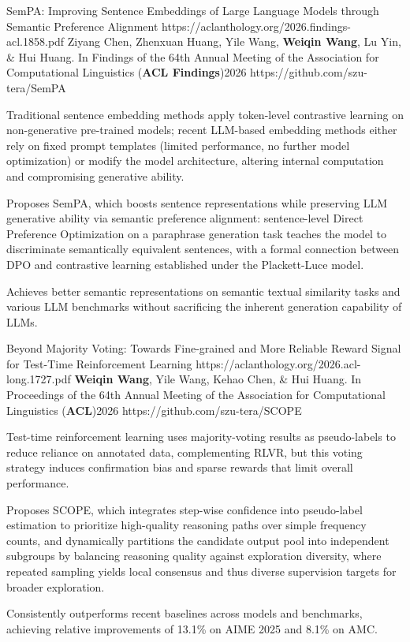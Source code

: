 \pub
  {SemPA: Improving Sentence Embeddings of Large Language Models through Semantic Preference Alignment}
  {https://aclanthology.org/2026.findings-acl.1858.pdf}
  {Ziyang Chen, Zhenxuan Huang, Yile Wang, \textbf{Weiqin Wang}, Lu Yin, \& Hui Huang.}
  {In Findings of the 64th Annual Meeting of the Association for Computational Linguistics (\textbf{ACL Findings})}{2026}
  {https://github.com/szu-tera/SemPA}
\begin{pubnotes}
  \item {}Traditional sentence embedding methods apply token-level contrastive learning on non-generative pre-trained models; recent LLM-based embedding methods either rely on fixed prompt templates (limited performance, no further model optimization) or modify the model architecture, altering internal computation and compromising generative ability.
  \item {}Proposes SemPA, which boosts sentence representations while preserving LLM generative ability via semantic preference alignment: sentence-level Direct Preference Optimization on a paraphrase generation task teaches the model to discriminate semantically equivalent sentences, with a formal connection between DPO and contrastive learning established under the Plackett-Luce model.
  \item {}Achieves better semantic representations on semantic textual similarity tasks and various LLM benchmarks without sacrificing the inherent generation capability of LLMs.
\end{pubnotes}

\pub
  {Beyond Majority Voting: Towards Fine-grained and More Reliable Reward Signal for Test-Time Reinforcement Learning}
  {https://aclanthology.org/2026.acl-long.1727.pdf}
  {\textbf{Weiqin Wang}, Yile Wang, Kehao Chen, \& Hui Huang.}
  {In Proceedings of the 64th Annual Meeting of the Association for Computational Linguistics (\textbf{ACL})}{2026}
  {https://github.com/szu-tera/SCOPE}
\begin{pubnotes}
  \item {}Test-time reinforcement learning uses majority-voting results as pseudo-labels to reduce reliance on annotated data, complementing RLVR, but this voting strategy induces confirmation bias and sparse rewards that limit overall performance.
  \item {}Proposes SCOPE, which integrates step-wise confidence into pseudo-label estimation to prioritize high-quality reasoning paths over simple frequency counts, and dynamically partitions the candidate output pool into independent subgroups by balancing reasoning quality against exploration diversity, where repeated sampling yields local consensus and thus diverse supervision targets for broader exploration.
  \item {}Consistently outperforms recent baselines across models and benchmarks, achieving relative improvements of 13.1\% on AIME 2025 and 8.1\% on AMC.
\end{pubnotes}


